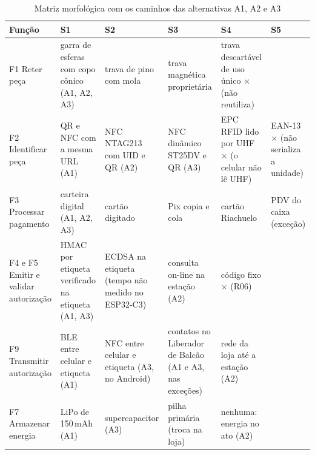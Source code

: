 \begin{table}[htbp]
    \centering
    \caption{Matriz morfológica com os caminhos das alternativas A1, A2 e A3}
    \label{tab:r2-morfologica}
    \scriptsize
    \setlength{\tabcolsep}{3pt}
    \renewcommand{\arraystretch}{1.25}
    \begin{tabularx}{\textwidth}{@{}
        >{\RaggedRight\arraybackslash}p{2.2cm}
        >{\RaggedRight\arraybackslash}X
        >{\RaggedRight\arraybackslash}X
        >{\RaggedRight\arraybackslash}X
        >{\RaggedRight\arraybackslash}X
        >{\RaggedRight\arraybackslash}X@{}}
        \toprule
        \textbf{Função} & \textbf{S1} & \textbf{S2} & \textbf{S3} & \textbf{S4} & \textbf{S5} \\
        \midrule
        F1 Reter peça & \cellcolor{r2laranjaclaro}garra de esferas com copo cônico (A1, A2, A3) & trava de pino com mola & trava magnética proprietária & trava descartável de uso único $\times$ (não reutiliza) & \\
        \addlinespace
        F2 Identificar peça & \cellcolor{r2laranjaclaro}QR e NFC com a mesma URL (A1) & \cellcolor{r2azulclaro}NFC NTAG213 com UID e QR (A2) & \cellcolor{r2verdeclaro}NFC dinâmico ST25DV e QR (A3) & EPC RFID lido por UHF $\times$ (o celular não lê UHF) & EAN-13 $\times$ (não serializa a unidade) \\
        \addlinespace
        F3 Processar pagamento & \cellcolor{r2laranjaclaro}carteira digital (A1, A2, A3) & cartão digitado & Pix copia e cola & cartão Riachuelo & PDV do caixa (exceção) \\
        \addlinespace
        F4 e F5 Emitir e validar autorização & \cellcolor{r2laranjaclaro}HMAC por etiqueta verificado na etiqueta (A1, A3) & ECDSA na etiqueta (tempo não medido no ESP32-C3) & \cellcolor{r2azulclaro}consulta on-line na estação (A2) & código fixo $\times$ (R06) & \\
        \addlinespace
        F9 Transmitir autorização & \cellcolor{r2laranjaclaro}BLE entre celular e etiqueta (A1) & \cellcolor{r2verdeclaro}NFC entre celular e etiqueta (A3, no Android) & \cellcolor{r2laranjaclaro}contatos no Liberador de Balcão (A1 e A3, nas exceções) & \cellcolor{r2azulclaro}rede da loja até a estação (A2) & \\
        \addlinespace
        F7 Armazenar energia & \cellcolor{r2laranjaclaro}LiPo de 150\,mAh (A1) & \cellcolor{r2verdeclaro}supercapacitor (A3) & pilha primária (troca na loja) & \cellcolor{r2azulclaro}nenhuma: energia no ato (A2) & \\

\end{tabularx}
\end{table}
